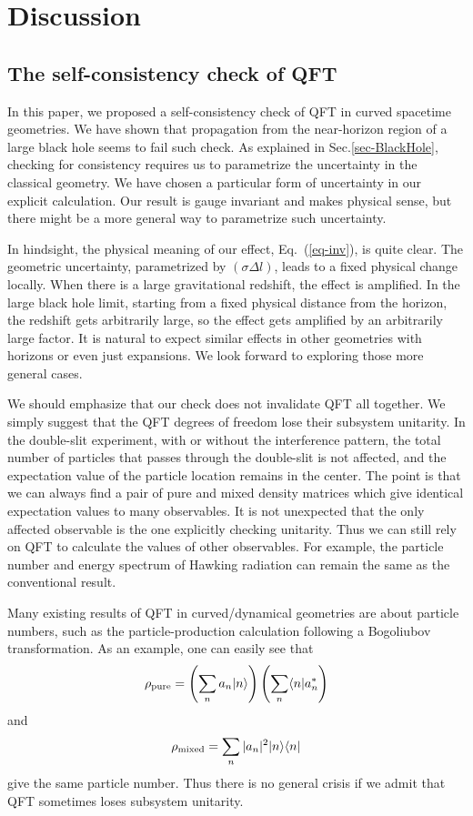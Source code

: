 \documentclass[aps,showpacs,onecolumn,floats,prd,superscriptaddress,nofootinbib]{revtex4-1}
\begin{document}
\section{Discussion}
\label{sec-dis}

\subsection{The self-consistency check of QFT}

In this paper, we proposed a self-consistency check of QFT in curved spacetime geometries.
We have shown that propagation from the near-horizon region of a large black hole seems to fail such check.
As explained in Sec.\ref{sec-BlackHole}, checking for consistency requires us to parametrize the uncertainty in the classical geometry.
We have chosen a particular form of uncertainty in our explicit calculation.
Our result is gauge invariant and makes physical sense, but there might be a more general way to parametrize such uncertainty.

In hindsight, the physical meaning of our effect, Eq.~(\ref{eq-inv}), is quite clear.
The geometric uncertainty, parametrized by $(\sigma\Delta l)$, leads to a fixed physical change locally.
When there is a large gravitational redshift, the effect is amplified.
In the large black hole limit, starting from a fixed physical distance from the horizon, the redshift gets arbitrarily large, so the effect gets amplified by an arbitrarily large factor.
It is natural to expect similar effects in other geometries with horizons or even just expansions.
We look forward to exploring those more general cases.

We should emphasize that our check does not invalidate QFT all together.
We simply suggest that the QFT degrees of freedom lose their subsystem unitarity.
In the double-slit experiment, with or without the interference pattern, the total number of particles that passes through the double-slit is not affected, and the expectation value of the particle location remains in the center.
The point is that we can always find a pair of pure and mixed density matrices which give identical expectation values to many observables.
It is not unexpected that the only affected observable is the one explicitly checking unitarity.
Thus we can still rely on QFT to calculate the values of other observables.
For example, the particle number and energy spectrum of Hawking radiation can remain the same as the conventional result.

Many existing results of QFT in curved/dynamical geometries are about particle numbers, such as the particle-production calculation following a Bogoliubov transformation. 
As an example, one can easily see that
\begin{equation}
\rho_{\rm pure} = \left(\sum_n a_n|n\rangle\right)
\left(\sum_n \langle n| a_n^*\right)
\end{equation}
and
\begin{equation}
\rho_{\rm mixed} = \sum_n |a_n|^2 |n\rangle\langle n|
\end{equation}
give the same particle number. 
Thus there is no general crisis if we admit that QFT sometimes loses subsystem unitarity. 
\end{document}
